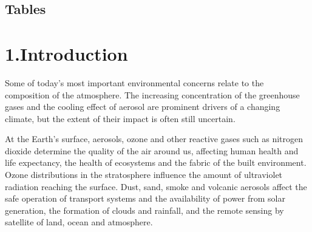 \documentclass[9pt]{report}
\begin{document}
\begin{mdtoc}
\begin{mdtocblock}
\begin{mdtocblock}
\begin{mdtocblock}

\end{mdtocblock}%
\end{mdtocblock}%



\end{mdtocblock}%
\end{mdtoc}%
\begin{mdtoc}%

\section*{Tables}\label{sec-tables}%

\begin{mdtocblock}%

\end{mdtocblock}%
\end{mdtoc}%

\section{1.\hspace*{0.5em}Introduction}\label{sec-introduction}%

\noindent{}Some of today’s most important environmental concerns relate to the 
composition of the atmosphere. The increasing concentration of the 
greenhouse gases and the cooling effect of aerosol are prominent 
drivers of a changing climate, but the extent of their impact is 
often still uncertain.%

At the Earth’s surface, aerosols, ozone and other reactive gases such as 
nitrogen dioxide determine the quality of the air around us, affecting 
human health and life expectancy, the health of ecosystems and the 
fabric of the built environment. Ozone distributions in the stratosphere 
influence the amount of ultraviolet radiation reaching the surface. 
Dust, sand, smoke and volcanic aerosols affect the safe operation of 
transport systems and the availability of power from solar generation, 
the formation of clouds and rainfall, and the remote sensing by satellite 
of land, ocean and atmosphere.%
\end{document}
